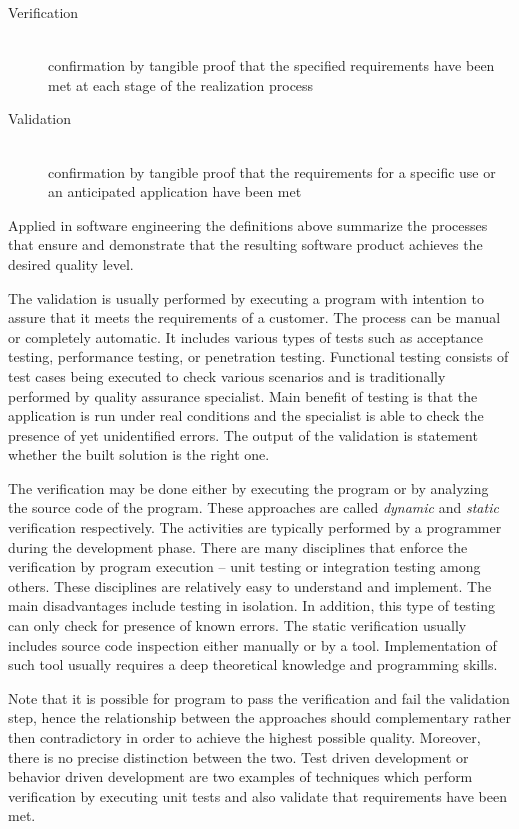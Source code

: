 \documentclass[12pt,final,oneside]{fithesis2}
\theoremstyle{definition}
\begin{document}
\begin{description}

\item[Verification] \hfill \\
confirmation by tangible proof that the specified requirements have
been met at each stage of the realization process

\item[Validation] \hfill \\
confirmation by tangible proof that the requirements for a specific use or
an anticipated application have been met

\end{description}

Applied in software engineering the definitions above summarize the
processes that ensure and demonstrate that the resulting software product
achieves the desired quality level.

The validation is usually performed by executing a program with intention
to assure that it meets the requirements of a customer.
The process can be manual or completely automatic. It includes
various types of tests such as acceptance testing, performance testing,
or penetration testing. Functional testing consists of test cases
being executed to check various scenarios and is traditionally performed
by quality assurance specialist. Main benefit of testing is that the
application is run under real conditions and the specialist is able to
check the presence of yet unidentified errors. The output of the validation
is statement whether the built solution is the right one.

The verification may be done either by executing the program or by
analyzing the source code of the program. These approaches are called
\textit{dynamic} and \textit{static} verification respectively. The activities
are typically performed by a programmer during the development phase.
There are many disciplines that enforce the verification by program
execution -- unit testing or integration testing among others. These
disciplines are relatively easy to understand and implement. The main
disadvantages include testing in isolation. In addition, this type of
testing can only check for presence of known errors. The static
verification usually includes source code inspection either manually or
by a tool. Implementation of such tool usually requires a deep
theoretical knowledge and programming skills.

Note that it is possible for program to pass the verification and
fail the validation step, hence the relationship between the approaches
should complementary rather then contradictory in order to achieve the
highest possible quality. Moreover, there is no
precise distinction between the two. Test driven development or behavior
driven development are two examples of techniques which perform
verification by executing unit tests and also validate that requirements
have been met.
\end{document}
